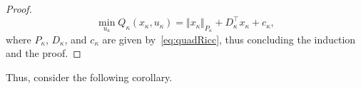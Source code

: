 \documentclass[10pt]{IEEEtran}      %
\newcommand{\tr}{\mathrm{tr}}
\theoremstyle{theorem}
\theoremstyle{remark}
\begin{document}
\begin{proof}
%
\begin{equation*}
\min_{u_\kappa}Q_\kappa(x_\kappa,u_\kappa) =\Vert x_\kappa \Vert_{P_\kappa} + D_\kappa^\top x_\kappa + c_\kappa,
\end{equation*}
where $P_{\kappa}$, $D_{\kappa}$, and $c_\kappa$ are given by~\eqref{eq:quadRicc}, thus concluding the induction and the proof.
\end{proof}

Thus, consider the following corollary.
\end{document}
